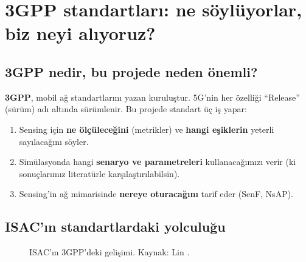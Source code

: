 \section{3GPP standartları: ne söylüyorlar, biz neyi alıyoruz?}\label{sec:3gpp}

\subsection{3GPP nedir, bu projede neden önemli?}

\textbf{3GPP}, mobil ağ standartlarını yazan kuruluştur. 5G'nin her özelliği ``Release'' (sürüm) adı altında sürümlenir. Bu projede standart üç iş yapar:
\begin{enumerate}
\item Sensing için \textbf{ne ölçüleceğini} (metrikler) ve \textbf{hangi eşiklerin} yeterli sayılacağını söyler.
\item Simülasyonda hangi \textbf{senaryo ve parametreleri} kullanacağımızı verir (ki sonuçlarımız literatürle karşılaştırılabilsin).
\item Sensing'in ağ mimarisinde \textbf{nereye oturacağını} tarif eder (SenF, NsAP).
\end{enumerate}

\subsection{ISAC'ın standartlardaki yolculuğu}

\begin{figure}[H]
\centering
{}
\caption{ISAC'ın 3GPP'deki gelişimi. Kaynak: Lin \cite{lin,lin20}.}
\end{figure}

